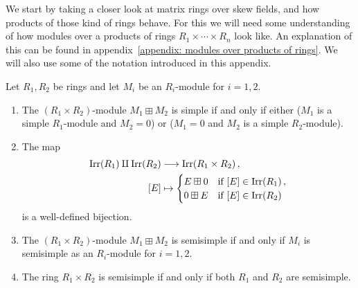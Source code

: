 \begin{fluff}
  We start by taking a closer look at matrix rings over skew fields, and how products of those kind of rings behave.
  For this we will need some understanding of how modules over a products of rings $R_1 \times \dotsb \times R_n$ look like.
  An explanation of this can be found in appendix~\ref{appendix: modules over products of rings}.
  We will also use some of the notation introduced in this appendix.
\end{fluff}


\begin{proposition}
  \label{proposition: product of semisimple}
  Let $R_1, R_2$ be rings and let $M_i$ be an $R_i$-module for $i = 1, 2$.
  \begin{enumerate}
    \item
      \label{enumerate: when boxplus is simple}
      The $(R_1 \times R_2)$-module $M_1 \boxplus M_2$ is simple if and only if either ($M_1$ is a simple $R_1$-module and $M_2 = 0$) or ($M_1 = 0$ and $M_2$ is a simple $R_2$-module).
    \item
      The map
      \begin{align*}
                  \operatorname{Irr}(R_1) \amalg \operatorname{Irr}(R_2)
        &\longrightarrow  \operatorname{Irr}(R_1 \times R_2) \,,
        \\
                  [E]
        &\mapsto  \begin{cases}
                    E \boxplus 0  & \text{if $[E] \in \operatorname{Irr}(R_1)$} \,, \\
                    0 \boxplus E  & \text{if $[E] \in \operatorname{Irr}(R_2)$}
                  \end{cases}
      \end{align*}
      is a well-defined bijection.
    \item
      \label{enumerate: when boxplus is semisimple}
      The $(R_1 \times R_2)$-module $M_1 \boxplus M_2$ is semisimple if and only if $M_i$ is semisimple as an $R_i$-module for $i = 1, 2$.
    \item
      The ring $R_1 \times R_2$ is semisimple if and only if both $R_1$ and $R_2$ are semisimple.
  \end{enumerate}
\end{proposition}


